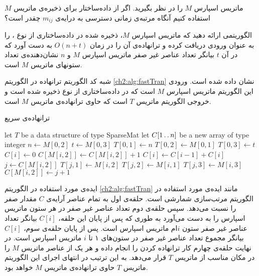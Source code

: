  ماتریس اسپارس {$M$} را در نظر بگیرید. اگر از داده‌ساختار {} برای ذخیره‌ی ماتریس {$M$} استفاده کنیم آنگاه مرتبه‌ی زمانی دسترسی به درایه‌ی {$m_{ij}$} چقدر است؟


 الگوریتمی ارائه دهید که ماتریس اسپارس {$M$}، ذخیره شده در داده‌ساختاری از نوع {}، را به عنوان ورودی دریافت کرده و ترانهاده‌ی آن را در زمان {$O(n+t)$} به دست آورد که در آن {$t$} بیانگر تعداد عناصر غیر صفر ماتریس اسپارس {$M$} و {$n$} نشان‌دهنده‌ی تعداد ستونهای ماتریس {$M$} است.


شبه کد الگوریتم ترانهاده در الگوریتم {\eqref{ch2:alg:fastTran}} نشان داده شده است. ورودی این الگوریتم ماتریس اسپارس {$M$} است که در داده‌ساختاری از نوع {} ذخیره شده است و خروجی الگوریتم ماتریس {$T$} است که حاوی ترانهاده‌ی ماتریس {$M$} است.
\begin{algorithm}
\caption{ترانهاده‌‌ی سریع}\label{ch2:alg:fastTran}
\begin{latin}
\begin{algorithmic}[1]
		\State	let $T$ be a data structure of type SparseMat
		\State	let $C[1\mathinner{\ldotp\ldotp} n]$ be a new array of type integer
		\State	$n \gets M[0,2]$
 		\State	$t \gets M[0,3]$
		\State	$T[0,1] \gets n$
		\State 	$T[0,2] \gets M[0,1]$
		\State	$T[0,3] \gets t$
				\State	\Return
		\Else							
						\State	$C[i] \gets 0$
				\EndFor
						\State	$C[M[i,2]] \gets C[M[i,2]]+1$		
				\EndFor	
						\State	$C[i] \gets C[i-1]+C[i]$		
				\EndFor	
						\State	$j \gets C[M[i,2]]$		
						\State	$T[j,1] \gets M[i,2]$
						\State	$T[j,2] \gets M[i,1]$
						\State	$T[j,3] \gets M[i,3]$
						\State	$C[M[i,2]] \gets j+1$
				\EndFor		
		\EndIf
\EndProcedure
\end{algorithmic}
\end{latin}
\end{algorithm}

ایده‌ی مورد استفاده در الگوریتم {\eqref{ch2:alg:fastTran}} مانند ایده‌ی مورد استفاده در الگوریتم مرتب‌سازی شمارشی است. حلقه‌ی اول به تمام عناصر آرایه‌ی {$C$} مقدار صفر را نسبت می‌دهد. سپس حلقه‌ی دوم تعداد عناصر غیر صفر در هر ستون ماتریس اسپارس را به دست می‌آورد به طوری که پس از پایان این حلقه، {$C[i]$} بیانگر تعداد عناصر غیر صفر ستون {$i$}ام ماتریس اسپارس است. پس از پایان حلقه‌ی سوم، {$C[i]$} بیانگر مجموع تعداد عناصر غیر صفر در ستون‌های ۱ تا {$i$} ماتریس اسپارس است. در نهایت حلقه‌ی چهارم کار ترانهاده کردن را انجام داده و هر یک از عناصر ماتریس {$M$} را در مکان مناسب از ماتریس {$T$} قرار می‌دهد. به این ترتیب در انتهای اجرای این الگوریتم ماتریس {$T$} حاوی ترانهاده‌ی ماتریس {$M$} خواهد بود.

